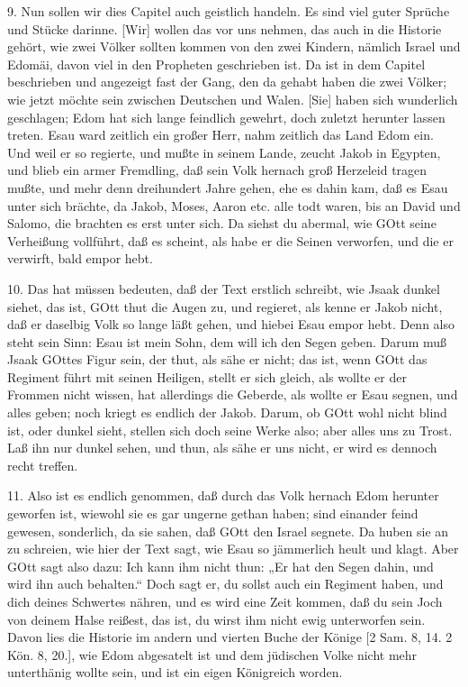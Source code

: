 9. Nun sollen wir dies Capitel auch geistlich handeln. Es sind viel guter Sprüche und Stücke darinne. [Wir] wollen das vor uns nehmen, das auch in die Historie gehört, wie zwei Völker sollten kommen von den zwei Kindern, nämlich Israel und Edomäi, davon viel in den Propheten geschrieben ist. Da ist in dem Capitel beschrieben und angezeigt fast der Gang, den da gehabt haben die zwei Völker; wie jetzt möchte sein zwischen Deutschen und Walen. [Sie] haben sich wunderlich geschlagen; Edom hat sich lange feindlich gewehrt, doch zuletzt herunter lassen treten. Esau ward zeitlich ein großer Herr, nahm zeitlich das Land Edom ein. Und weil er so regierte, und mußte in seinem Lande, zeucht Jakob in Egypten, und blieb ein armer Fremdling, daß sein Volk hernach groß Herzeleid tragen mußte, und mehr denn dreihundert Jahre gehen, ehe es dahin kam, daß es Esau unter sich brächte, da Jakob, Moses, Aaron etc. alle todt waren, bis an David und Salomo, die brachten es erst unter sich. Da siehst du abermal, wie GOtt seine Verheißung vollführt, daß es scheint, als habe er die Seinen verworfen, und die er verwirft, bald empor hebt.

10. Das hat müssen bedeuten, daß der Text erstlich schreibt, wie Jsaak dunkel siehet, das ist, GOtt thut die Augen zu, und regieret, als kenne er Jakob nicht, daß er daselbig Volk so lange läßt gehen, und hiebei Esau empor hebt. Denn also steht sein Sinn: Esau ist mein Sohn, dem will ich den Segen geben. Darum muß Jsaak GOttes Figur sein, der thut, als sähe er nicht; das ist, wenn GOtt das Regiment führt mit seinen Heiligen, stellt er sich gleich, als wollte er der Frommen nicht wissen, hat allerdings die Geberde, als wollte er Esau segnen, und alles geben; noch kriegt es endlich der Jakob. Darum, ob GOtt wohl nicht blind ist, oder dunkel sieht, stellen sich doch seine Werke also; aber alles uns zu Trost. Laß ihn nur dunkel sehen, und thun, als sähe er uns nicht, er wird es dennoch recht treffen.

11. Also ist es endlich genommen, daß durch das Volk hernach Edom herunter geworfen ist, wiewohl sie es gar ungerne gethan haben; sind einander feind gewesen, sonderlich, da sie sahen, daß GOtt den Israel segnete. Da huben sie an zu schreien, wie hier der Text sagt, wie Esau so jämmerlich heult und klagt. Aber GOtt sagt also dazu: Ich kann ihm nicht thun: „Er hat den Segen dahin, und wird ihn auch behalten.“ Doch sagt er, du sollst auch ein Regiment haben, und dich deines Schwertes nähren, und es wird eine Zeit kommen, daß du sein Joch von deinem Halse reißest, das ist, du wirst ihm nicht ewig unterworfen sein. Davon lies die Historie im andern und vierten Buche der Könige [2 Sam. 8, 14. 2 Kön. 8, 20.], wie Edom abgesatelt ist und dem jüdischen Volke nicht mehr unterthänig wollte sein, und ist ein eigen Königreich worden.

